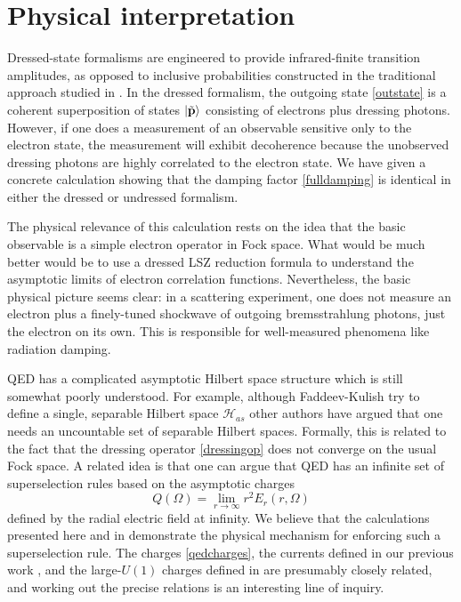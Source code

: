 \documentclass[twocolumn,prd]{revtex4}
\newcommand{\Hi}{\mathcal{H}}
\newcommand{\be}{\begin{equation}}
\newcommand{\ee}{\end{equation}}
\newcommand{\mb}{\mathbf}
\begin{document}
\section{Physical interpretation}
\label{discussion}

Dressed-state formalisms are engineered to provide infrared-finite transition amplitudes, as opposed to inclusive probabilities constructed in the traditional approach studied in \cite{Carney:2017jut}. In the dressed formalism, the outgoing state \eqref{outstate} is a coherent superposition of states $\ket{\tilde{\mb{p}}}$ consisting of electrons plus dressing photons. However, if one does a measurement of an observable sensitive only to the electron state, the measurement will exhibit decoherence because the unobserved dressing photons are highly correlated to the electron state. We have given a concrete calculation showing that the damping factor \eqref{fulldamping} is identical in either the dressed or undressed formalism.

The physical relevance of this calculation rests on the idea that the basic observable is a simple electron operator in Fock space. What would be much better would be to use a dressed LSZ reduction formula to understand the asymptotic limits of electron correlation functions. \cite{Zwanziger:1974jz,Dybalski:2017mip} Nevertheless, the basic physical picture seems clear: in a scattering experiment, one does not measure an electron plus a finely-tuned shockwave of outgoing bremsstrahlung photons, just the electron on its own. This is responsible for well-measured phenomena like radiation damping.

QED has a complicated asymptotic Hilbert space structure which is still somewhat poorly understood.  For example, although Faddeev-Kulish try to define a single, separable Hilbert space $\Hi_{as}$ \cite{Kulish:1970ut,Dybalski:2017mip} other authors have argued that one needs an uncountable set of separable Hilbert spaces.\cite{kibble,Zwanziger:1974jz} Formally, this is related to the fact that the dressing operator \eqref{dressingop} does not converge on the usual Fock space. A related idea is that one can argue that QED has an infinite set of superselection rules based on the asymptotic charges
\be
\label{qedcharges}
Q(\Omega) = \lim_{r \to \infty} r^2 E_r(r,\Omega)
\ee
defined by the radial electric field at infinity.\cite{Gervais:1980bz,Buchholz:1982ea} We believe that the calculations presented here and in \cite{Carney:2017jut} demonstrate the physical mechanism for enforcing such a superselection rule. The charges \eqref{qedcharges}, the currents defined in our previous work \cite{Carney:2017jut}, and the large-$U(1)$ charges defined in \cite{Kapec:2015ena,Campiglia:2015qka} are presumably closely related, and working out the precise relations is an interesting line of inquiry. 
\end{document}
